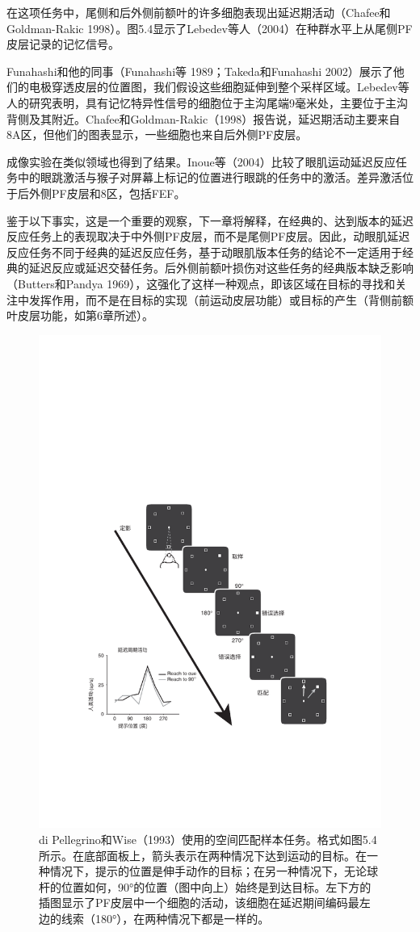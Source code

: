 在这项任务中，尾侧和后外侧前额叶的许多细胞表现出延迟期活动（Chafee和Goldman-Rakic 1998）。图5.4显示了Lebedev等人（2004）在种群水平上从尾侧PF皮层记录的记忆信号。

Funahashi和他的同事（Funahashi等 1989；Takeda和Funahashi 2002）展示了他们的电极穿透皮层的位置图，我们假设这些细胞延伸到整个采样区域。Lebedev等人的研究表明，具有记忆特异性信号的细胞位于主沟尾端9毫米处，主要位于主沟背侧及其附近。Chafee和Goldman-Rakic（1998）报告说，延迟期活动主要来自8A区，但他们的图表显示，一些细胞也来自后外侧PF皮层。

成像实验在类似领域也得到了结果。Inoue等（2004）比较了眼肌运动延迟反应任务中的眼跳激活与猴子对屏幕上标记的位置进行眼跳的任务中的激活。差异激活位于后外侧PF皮层和8区，包括FEF。

鉴于以下事实，这是一个重要的观察，下一章将解释，在经典的、达到版本的延迟反应任务上的表现取决于中外侧PF皮层，而不是尾侧PF皮层。因此，动眼肌延迟反应任务不同于经典的延迟反应任务，基于动眼肌版本任务的结论不一定适用于经典的延迟反应或延迟交替任务。后外侧前额叶损伤对这些任务的经典版本缺乏影响（Butters和Pandya 1969），这强化了这样一种观点，即该区域在目标的寻找和关注中发挥作用，而不是在目标的实现（前运动皮层功能）或目标的产生（背侧前额叶皮层功能，如第6章所述）。

\begin{figure}
	\centering
	\includegraphics[width=0.7\linewidth]{image_pfc/Fig_5_5}
	\caption{di Pellegrino和Wise（1993）使用的空间匹配样本任务。格式如图5.4所示。在底部面板上，箭头表示在两种情况下达到运动的目标。在一种情况下，提示的位置是伸手动作的目标；在另一种情况下，无论球杆的位置如何，90°的位置（图中向上）始终是到达目标。左下方的插图显示了PF皮层中一个细胞的活动，该细胞在延迟期间编码最左边的线索（180°），在两种情况下都是一样的。}
	\label{fig:fig}
\end{figure}

